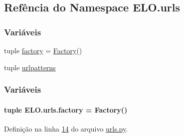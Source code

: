 \hypertarget{namespaceELO_1_1urls}{\subsection{Refência do Namespace E\-L\-O.\-urls}
\label{namespaceELO_1_1urls}
}
\subsubsection*{Variáveis}
\begin{DoxyCompactItemize}
\item 
tuple \hyperlink{namespaceELO_1_1urls_a85325dfebd736ced5558533f2c4bc29a}{factory} = \hyperlink{classELO_1_1MainUnit_1_1Factory}{Factory}()
\item 
tuple \hyperlink{namespaceELO_1_1urls_a3451f093ed6ab05c006fd0d1cdba836d}{urlpatterns}
\end{DoxyCompactItemize}


\subsubsection{Variáveis}
\hypertarget{namespaceELO_1_1urls_a85325dfebd736ced5558533f2c4bc29a}{
\paragraph[{factory}]{\setlength{\rightskip}{0pt plus 5cm}tuple E\-L\-O.\-urls.\-factory = {\bf Factory}()}}\label{namespaceELO_1_1urls_a85325dfebd736ced5558533f2c4bc29a}


Definição na linha \hyperlink{urls_8py_source_l00014}{14} do arquivo \hyperlink{urls_8py_source}{urls.\-py}.

